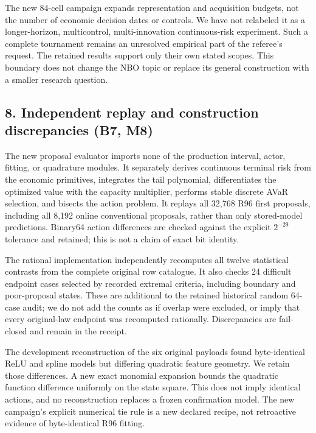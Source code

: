 The new 84-cell campaign expands representation and acquisition budgets,
not the number of economic decision dates or controls. We have not
relabeled it as a longer-horizon, multicontrol, multi-innovation
continuous-risk experiment. Such a complete tournament remains an
unresolved empirical part of the referee's request. The retained results
support only their own stated scopes. This boundary does not change the
NBO topic or replace its general construction with a smaller research
question.

\hypertarget{independent-replay-and-construction-discrepancies-b7-m8}{%
\subsection{8. Independent replay and construction discrepancies (B7,
M8)}\label{independent-replay-and-construction-discrepancies-b7-m8}}

The new proposal evaluator imports none of the production interval,
actor, fitting, or quadrature modules. It separately derives continuous
terminal risk from the economic primitives, integrates the tail
polynomial, differentiates the optimized value with the capacity
multiplier, performs stable discrete AVaR selection, and bisects the
action problem. It replays all 32,768 R96 first proposals, including all
8,192 online conventional proposals, rather than only stored-model
predictions. Binary64 action differences are checked against the
explicit \(2^{-29}\) tolerance and retained; this is not a claim of
exact bit identity.

The rational implementation independently recomputes all twelve
statistical contrasts from the complete original row catalogue. It also
checks 24 difficult endpoint cases selected by recorded extremal
criteria, including boundary and poor-proposal states. These are
additional to the retained historical random 64-case audit; we do not
add the counts as if overlap were excluded, or imply that every
original-law endpoint was recomputed rationally. Discrepancies are
fail-closed and remain in the receipt.

The development reconstruction of the six original payloads found
byte-identical ReLU and spline models but differing quadratic feature
geometry. We retain those differences. A new exact monomial expansion
bounds the quadratic function difference uniformly on the state square.
This does not imply identical actions, and no reconstruction replaces a
frozen confirmation model. The new campaign's explicit numerical tie
rule is a new declared recipe, not retroactive evidence of
byte-identical R96 fitting.


